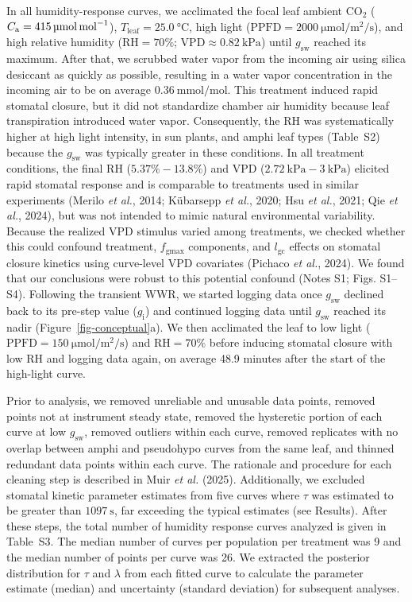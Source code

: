 \documentclass[
  letterpaper,
  DIV=11,
  numbers=noendperiod]{scrartcl}
\newcommand{\caequals}[1]{$C_\mathrm{a} = \SI{#1}{\micro\mol\raiseto{-1}\mol}$}
\newcommand{\fgmax}{$f_\mathrm{gmax}$}
\newcommand{\gcl}{$l_\mathrm{gc}$}
\newcommand{\gi}{$g_\mathrm{i}$}
\newcommand{\gsw}{$g_\mathrm{sw}$}
\newcommand{\ppfdequals}[1]{$\mathrm{PPFD} = \SI{#1}{\micro\mole\per\meter\squared\per\second}$}
\newcommand{\rh}{$\mathrm{RH}$}
\newcommand{\rhequals}[1]{$\mathrm{RH} = #1\%$}
\newcommand{\tleafequals}[1]{$T_\mathrm{leaf} = \SI{#1}{\degreeCelsius}$}
\begin{document}
In all humidity-response curves, we acclimated the focal leaf ambient
CO\(_2\) (\caequals{415}), \tleafequals{25.0}, high light
(\ppfdequals{2000}), and high relative humidity (\rhequals{70};
\(\mathrm{VPD} \approx \SI{0.82}{\kPa}\)) until \gsw{} reached its
maximum. After that, we scrubbed water vapor from the incoming air using
silica desiccant as quickly as possible, resulting in a water vapor
concentration in the incoming air to be on average
\(\SI{0.36}{\milli\mol\per\mol}\). This treatment induced rapid stomatal
closure, but it did not standardize chamber air humidity because leaf
transpiration introduced water vapor. Consequently, the RH was
systematically higher at high light intensity, in sun plants, and amphi
leaf types (Table~S2) because the \gsw{} was typically
greater in these conditions. In all treatment conditions, the final RH
(\(5.37\%-13.8\%\)) and VPD (\(\SI{2.72}{\kPa} - \SI{3}{\kPa}\))
elicited rapid stomatal response and is comparable to treatments used in
similar experiments (Merilo \emph{et al.}, 2014; Kübarsepp \emph{et
al.}, 2020; Hsu \emph{et al.}, 2021; Qie \emph{et al.}, 2024), but was
not intended to mimic natural environmental variability. Because the
realized VPD stimulus varied among treatments, we checked whether this
could confound treatment, \fgmax{} components, and \gcl{} effects on
stomatal closure kinetics using curve-level VPD covariates (Pichaco
\emph{et al.}, 2024). We found that our conclusions were robust to this
potential confound (Notes S1; Figs.
S1--S4). Following the transient
WWR, we started logging data once \gsw{} declined back to its pre-step
value (\gi) and continued logging data until \gsw{} reached its nadir
(Figure~\ref{fig-conceptual}a). We then acclimated the leaf to low light
(\ppfdequals{150}) and \rhequals{70} before inducing stomatal closure
with low \rh{} and logging data again, on average 48.9 minutes after the
start of the high-light curve.

Prior to analysis, we removed unreliable and unusable data points,
removed points not at instrument steady state, removed the hysteretic
portion of each curve at low \gsw{}, removed outliers within each curve,
removed replicates with no overlap between amphi and pseudohypo curves
from the same leaf, and thinned redundant data points within each curve.
The rationale and procedure for each cleaning step is described in Muir
\emph{et al.} (2025). Additionally, we excluded stomatal kinetic
parameter estimates from five curves where \(\tau\) was estimated to be
greater than \(\SI{1097}{\second}\), far exceeding the typical estimates
(see Results). After these steps, the total number of humidity response
curves analyzed is given in Table~S3. The median
number of curves per population per treatment was 9 and the median
number of points per curve was 26. We extracted the posterior
distribution for \(\tau\) and \(\lambda\) from each fitted curve to
calculate the parameter estimate (median) and uncertainty (standard
deviation) for subsequent analyses.
\end{document}
